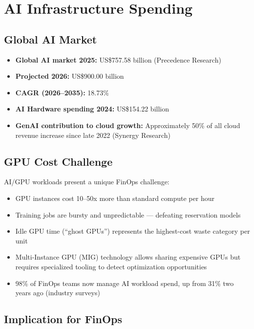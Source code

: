 \documentclass[a4paper,11pt]{article}
\begin{document}
\section{AI Infrastructure Spending}

\subsection{Global AI Market}

\begin{itemize}[itemsep=2mm]
    \item \textbf{Global AI market 2025:} US\$757.58 billion (Precedence Research)
    \item \textbf{Projected 2026:} US\$900.00 billion
    \item \textbf{CAGR (2026--2035):} 18.73\%
    \item \textbf{AI Hardware spending 2024:} US\$154.22 billion
    \item \textbf{GenAI contribution to cloud growth:} Approximately 50\% of all cloud revenue increase since late 2022 (Synergy Research)
\end{itemize}

\subsection{GPU Cost Challenge}

AI/GPU workloads present a unique FinOps challenge:

\begin{itemize}[itemsep=1mm]
    \item GPU instances cost 10--50x more than standard compute per hour
    \item Training jobs are bursty and unpredictable --- defeating reservation models
    \item Idle GPU time (``ghost GPUs'') represents the highest-cost waste category per unit
    \item Multi-Instance GPU (MIG) technology allows sharing expensive GPUs but requires specialized tooling to detect optimization opportunities
    \item 98\% of FinOps teams now manage AI workload spend, up from 31\% two years ago (industry surveys)
\end{itemize}

\subsection{Implication for FinOps}
\end{document}
